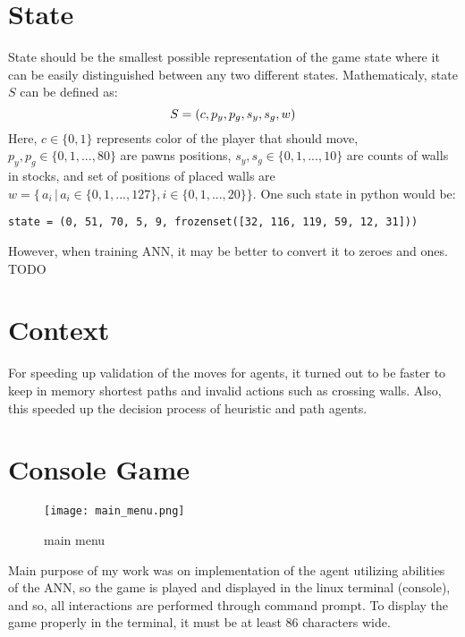\section{State}
State should be the smallest possible representation of the game state where
it can be easily distinguished between any two different states. Mathematicaly,
state $S$ can be defined as:
\begin{equation}
  \label{eqn:state_def}
  S = (c, p_y, p_g, s_y, s_g, w)
  \vspace*{-0.20cm}
\end{equation}
Here, $c\in\{0, 1\} $ represents color of the player that should move,
$p_y,p_g\in\{0,1,...,80\}$ are pawns positions,
${s_y},{s_g} \in \{0, 1, ..., 10\}$ are counts of walls in stocks,
and set of positions of placed walls are
${w = \{\,a_i\,|\,a_i \in \{0, 1, ..., 127\}, i \in \{0, 1, ..., 20\} \}}$.
One such state in python would be:
\begin{lstlisting}
state = (0, 51, 70, 5, 9, frozenset([32, 116, 119, 59, 12, 31]))
\end{lstlisting}

However, when training ANN, it may be better to convert it to zeroes and ones.
TODO


\section{Context}
For speeding up validation of the moves for agents, it turned out to be faster
to keep in memory shortest paths and invalid actions such as crossing walls.
Also, this speeded up the decision process of heuristic and path agents.

\section{Console Game}
\begin{wrapfigure}{r}{0.5\textwidth}
  \vspace*{-2.05cm}
  \centering
  \texttt{[image: main\_menu.png]}
  \vspace*{-0.35cm}
  \caption{main menu}
  \label{fig:main_menu}
  \vspace*{-0.70cm}
\end{wrapfigure}

Main purpose of my work was on implementation of the agent utilizing abilities
of the ANN, so the game is played and displayed in the linux terminal
(console), and so, all interactions are performed through command prompt.
To display the game properly in the terminal, it must be at least 86 characters
wide.

